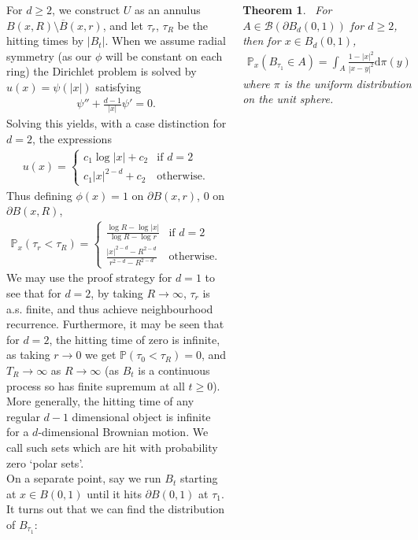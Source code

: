 \documentclass{tikzposter} %
\newcommand{\mc}{\mathcal}
\renewcommand\P[1]{\mathbb{P}\left(#1\right)}
\newcommand\Pj{\mathbb{P}}
\newtheorem{theorem}{Theorem}
\begin{document}
\begin{columns}
{    For $d \ge 2$, we construct $U$ as an annulus $B(x, R) \setminus \overline{B}(x, r)$, and let $\tau_r$, $\tau_R$ be the hitting times by $|B_t|$. When we assume radial symmetry (as our $\phi$ will be constant on each ring) the Dirichlet problem is solved by $u(x) = \psi(| x |)$ satisfying
    \begin{align*}
      \psi'' + \frac{d-1}{|x|} \psi' = 0.
      \end{align*}
    Solving this yields, with a case distinction for $d = 2$, the expressions
    \begin{align*}
    u(x) = \begin{cases}
    c_1 \log |x| + c_2 & \text{if } d = 2 \\
    c_1 | x |^{2-d} + c_2 & \text{otherwise.}
    \end{cases}
    \end{align*}
    Thus defining $\phi(x) = 1$ on $\partial B(x, r)$, $0$ on $\partial B(x, R)$,
    \begin{align*}
    \Pj_{x}\left(\tau_r < \tau_R\right) = \begin{cases}
    \displaystyle \frac{\log R - \log |x|}{\log R - \log r} & \text{if } d = 2 \\[1em]
    \displaystyle \frac{|x|^{2-d} - R^{2-d}}{r^{2-d} - R^{2-d}} & \text{otherwise.}
    \end{cases}
    \end{align*}
    We may use the proof strategy for $d = 1$ to see that for $d = 2$, by taking $R \to \infty$, $\tau_r$ is a.s. finite, and thus achieve neighbourhood recurrence. Furthermore, it may be seen that for $d = 2$, the hitting time of zero is infinite, as taking $r \to 0$ we get $\P{\tau_0 < \tau_R} = 0$, and $T_R \to \infty$ as $R \to \infty$ (as $B_t$ is a continuous process so has finite supremum at all $t \ge 0$). \\

    More generally, the hitting time of any regular $d-1$ dimensional object is infinite for a $d$-dimensional Brownian motion. We call such sets which are hit with probability zero `polar sets'.  \\

    On a separate point, say we run $B_t$ starting at $x \in B(0, 1)$ until it hits $\partial B(0, 1)$ at $\tau_1$. It turns out that we can find the distribution of $B_{\tau_1}$:

    \begin{theorem}
    \ For $A \in \mc{B}(\partial B_d(0, 1))$  for $d \ge 2$, then for $x \in B_d(0, 1)$,
    \begin{align*}
    \Pj_x\left(B_{\tau_1} \in A\right) = \int_{A} \frac{1 - |x|^2}{|x-y|^2} \mathrm{d}\pi(y)
    \end{align*}
    where $\pi$ is the uniform distribution on the unit sphere.
    \end{theorem}
    \hphantom{}

}
\end{columns}
\end{document}
